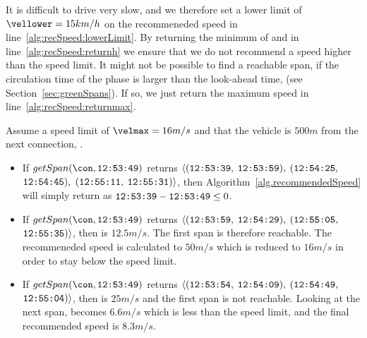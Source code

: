 It is difficult to drive very slow, and we therefore set a lower limit of $\vellower=15km/h$ on the recommeneded speed in line~\ref{alg:recSpeed:lowerLimit}. 
By returning the minimum of \velrec and \velmax in line~\ref{alg:recSpeed:returnh} we ensure that we do not recommend a speed higher than the speed limit.
It might not be possible to find a reachable span, if the circulation time of the phase is larger than the look-ahead time, \tmax (see Section~\ref{sec:greenSpans}).
If so, we just return the maximum speed in line~\ref{alg:recSpeed:returnmax}.

Assume a speed limit of $\velmax = 16 m/s$ and that the vehicle is $500 m$ from the next connection, \con.
\begin{itemize} %
\item If $getSpan(\con, \verb#12:53:49#)$ returns $\langle(\verb#12:53:39#,$ $\verb#12:53:59#),$ $(\verb#12:54:25#,$ $\verb#12:54:45#),$ $(\verb#12:55:11#,$ $\verb#12:55:31#)\rangle$, then Algorithm~\ref{alg.recommendedSpeed} will simply return \velmax as $\verb#12:53:39#-\verb#12:53:49# \leq 0$.
\item If $getSpan(\con, \verb#12:53:49#)$ returns $\langle(\verb#12:53:59#,$ $\verb#12:54:29#),$ $(\verb#12:55:05#,$ $\verb#12:55:35#)\rangle$, then \velslow is $12.5 m/s$.
The first span is therefore reachable. 
The recommeneded speed is calculated to $50m/s$ which is reduced to $16 m/s$ in order to stay below the speed limit.
\item If $getSpan(\con, \verb#12:53:49#)$ returns $\langle(\verb#12:53:54#,$ $\verb#12:54:09#),$ $(\verb#12:54:49#,$ $\verb#12:55:04#)\rangle$, then \velslow is $25 m/s$ and the first span is not reachable.
Looking at the next span, \velslow becomes $6.6m/s$ which is less than the speed limit, and the final recommended speed is $8.3 m/s$.
\end{itemize}

